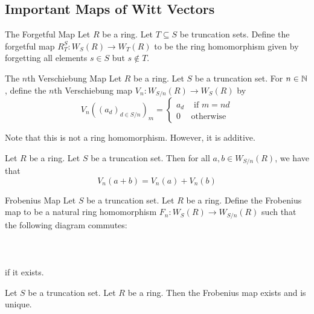 \documentclass[a4paper]{article}
\begin{document}
\subsection{Important Maps of Witt Vectors}
\begin{defn}{The Forgetful Map}{} Let $R$ be a ring. Let $T\subseteq S$ be truncation sets. Define the forgetful map $R_T^S:W_S(R)\to W_T(R)$ to be the ring homomorphism given by forgetting all elements $s\in S$ but $s\notin T$. 
\end{defn}

\begin{defn}{The $n$th Verschiebung Map}{} Let $R$ be a ring. Let $S$ be a truncation set. For $n\in\mathbb{N}$, define the $n$th Verschiebung map $V_n:W_{S/n}(R)\to W_S(R)$ by $$V_n((a_d)_{d\in S/n})_m=\begin{cases}
a_d & \text{ if } m=nd\\
0 & \text{otherwise}
\end{cases}$$
\end{defn}

Note that this is not a ring homomorphism. However, it is additive. 

\begin{lmm}{}{} Let $R$ be a ring. Let $S$ be a truncation set. Then for all $a,b\in W_{S/n}(R)$, we have that $$V_n(a+b)=V_n(a)+V_n(b)$$
\end{lmm}

\begin{defn}{Frobenius Map}{} Let $S$ be a truncation set. Let $R$ be a ring. Define the Frobenius map to be a natural ring homomorphism $F_n:W_S(R)\to W_{S/n}(R)$ such that the following diagram commutes: \\~\\
\\~\\
if it exists. 
\end{defn}

\begin{lmm}{}{} Let $S$ be a truncation set. Let $R$ be a ring. Then the Frobenius map exists and is unique. 
\end{lmm}
\end{document}

